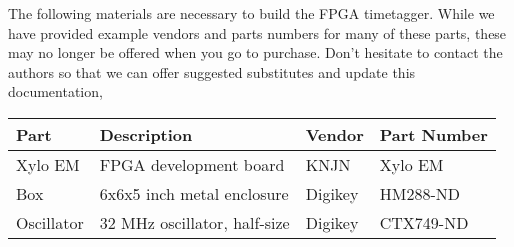The following materials are necessary to build the FPGA
timetagger. While we have provided example vendors and parts numbers
for many of these parts, these may no longer be offered when you go to
purchase. Don't hesitate to contact the authors so that we can offer
suggested substitutes and update this documentation,

\begin{table}
  \center
  \begin{tabular}{|l|l|ll|}
    \hline
    Part & Description & Vendor & Part Number \\
    \hline
    Xylo EM    & FPGA development board               & KNJN      & Xylo EM \\
    Box        & 6x6x5 inch metal enclosure           & Digikey   & HM288-ND \\
    Oscillator & 32 MHz oscillator, half-size         & Digikey   & CTX749-ND \\
    \hline
  \end{tabular}
\end{table}



